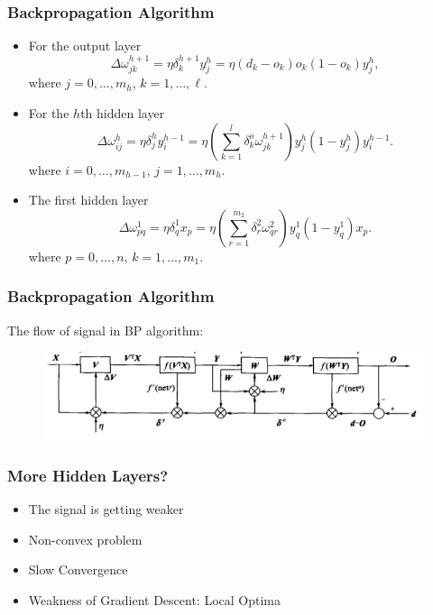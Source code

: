 \documentclass{beamer}
\begin{document}
\begin{frame}
	\frametitle{Backpropagation Algorithm}
\begin{itemize}
	\item For the output layer
	\begin{equation*}
	\Delta \omega_{jk}^{h+1} = \eta\delta_{k}^{h+1}y_{j}^{h}=\eta(d_{k}-o_{k})o_{k}(1-o_{k})y_{j}^{h},
	\end{equation*}
	where $j=0,\ldots, m_{h}$, $k=1,\ldots,\ell$.
	\item For the $h$th hidden layer
		\begin{equation*}
		\Delta \omega_{ij}^{h} =\eta \delta_{j}^{h}y_{i}^{h-1} = \eta\left(\sum_{k=1}^{l}\delta_{k}^{o}\omega_{jk}^{h+1}\right)y_{j}^{h}(1-y_{j}^{h})y_{i}^{h-1}.
		\end{equation*}
			where $i=0,\ldots, m_{h-1}$, $j=1,\ldots,m_{h}$.
	\item The first hidden layer
		\begin{equation*}
		\Delta \omega_{pq}^{1} =\eta\delta_{q}^{1}x_{p}= \eta\left(\sum_{r=1}^{m_{2}}\delta_{r}^{2}\omega_{qr}^{2}\right)y_{q}^{1}(1-y_{q}^{1})x_{p}.
		\end{equation*}
			where $p=0,\ldots, n$, $k=1,\ldots,m_{1}$.
\end{itemize}
\end{frame}

\begin{frame}
	\frametitle{Backpropagation Algorithm}
	The flow of signal in BP algorithm:
	\begin{figure}
		\includegraphics[width=\linewidth]{bp_flow.png}
	\end{figure}
\end{frame}

\begin{frame}
	\frametitle{More Hidden Layers?}
	\begin{itemize}
		\item The signal is getting weaker
		\item Non-convex problem
		\item Slow Convergence
		\item Weakness of Gradient Descent: Local Optima
	\end{itemize}
\end{frame}
\end{document}
